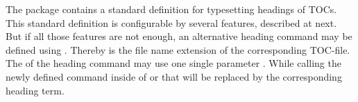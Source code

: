 \begin{Declaration}
\end{Declaration}
%
The package  contains a standard definition for typesetting
headings of TOCs. This standard definition is configurable by several
features, described at  next. But if all those features are
not enough, an alternative heading command may be defined using
. Thereby  is the file name extension of
the corresponding TOC-file. The  of the heading command may
use one single parameter . While calling the newly defined command
inside of  or  that  will be
replaced by the corresponding heading term.%
%

